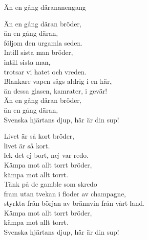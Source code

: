 \begin{song}{Än en gång däran}{anengang}
\begin{vers}
Än en gång däran bröder,\\
än en gång däran,  \\
följom den urgamla seden.   \\
Intill sista man bröder,\\
intill sista man,\\
trotsar vi hatet och vreden.\\
Blankare vapen sågs aldrig i en här,\\
än dessa glasen, kamrater, i gevär!\\
Än en gång däran bröder,\\
än en gång däran,  \\
Svenska hjärtans djup, här är din sup!\\
\end{vers}
\begin{vers}
Livet är så kort bröder,\\
livet är så kort.\\
lek det ej bort, nej var redo.\\
Kämpa mot allt torrt bröder,\\
kämpa mot allt torrt. \\
Tänk på de gamble som skredo\\
fram utan tvekan i floder av champagne,\\
styrkta från början av brännvin från vårt land.\\
Kämpa mot allt torrt bröder,\\
kämpa mot allt torrt.\\
Svenska hjärtans djup, här är din sup!\\
\end{vers}
\end{song}

\newpage


